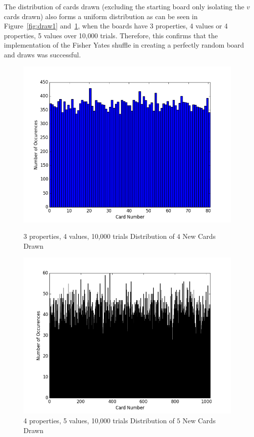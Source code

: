 \documentclass[pageno]{jpaper}
\begin{document}
The distribution of cards drawn (excluding the starting board only isolating the $v$ cards drawn) also forms a uniform distribution as can be seen in Figure~\ref{fig:draw1}  and~\ref{fig:draw2}, when the boards have 3 properties, 4 values or 4 properties, 5 values over 10,000 trials. Therefore, this confirms that the implementation of the Fisher Yates shuffle in creating a perfectly random board and draws was successful. 

\begin{figure}[htbb]
\begin{minipage}[b]{0.5\linewidth}
\centering
\includegraphics[width=.75\linewidth]{3p4v10000Draw.png}
\caption{3 properties, 4 values, 10,000 trials Distribution of $4$ New Cards Drawn}
\label{fig:draw1}
\end{minipage}
\hspace{0.5cm}
\begin{minipage}[b]{0.5\linewidth}
\centering
\includegraphics[width=.75\linewidth]{4p5v10000Draw.png}
\caption{4 properties, 5 values, 10,000 trials Distribution of $5$ New Cards Drawn}
\label{fig:draw2}
\end{minipage}
\end{figure}
\end{document}
